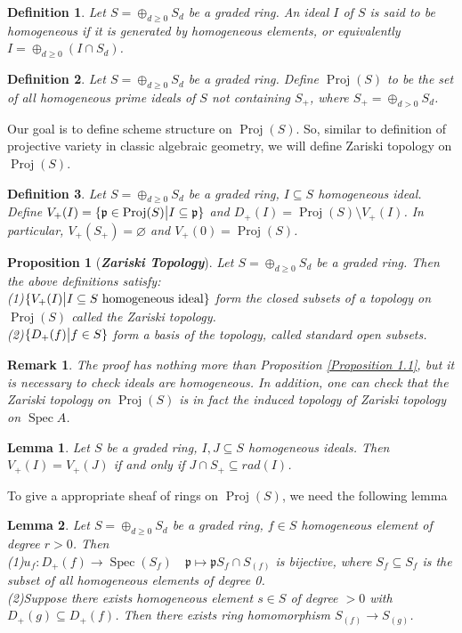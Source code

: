 \documentclass{ctexart}
\newtheorem{definition}{Definition}[section]
\newtheorem{remark}{Remark}[section]
\newtheorem{proposition}{Proposition}[section]
\newtheorem{lemma}{Lemma}[section]
\newcommand{\spec}{\operatorname{Spec}}
\newcommand{\proj}{\operatorname{Proj}}
\begin{document}
\begin{definition}
    Let $S = \oplus_{d \ge 0} S_{d}$ be a graded ring.
    An ideal $I$ of $S$ is said to be homogeneous if it is generated by homogeneous elements,
    or equivalently $I = \oplus_{d \ge 0} (I \cap S_{d})$.
\end{definition}
\begin{definition}
    Let $S = \oplus_{d \ge 0} S_{d}$ be a graded ring.
    Define $\proj(S)$ to be the set of all homogeneous prime ideals of $S$ not containing $S_{+}$,
    where $S_{+} = \oplus_{d > 0} S_{d}$.
\end{definition}
Our goal is to define scheme structure on $\proj(S)$.
So, similar to definition of projective variety in classic algebraic geometry, we will define Zariski topology on $\proj(S)$.
\begin{definition}
    Let $S = \oplus_{d \ge 0} S_{d}$ be a graded ring, $I \subseteq S$ homogeneous ideal.
    Define $V_{+}(I) = \{\mathfrak{p}\in \proj(S) \big{|} I \subseteq \mathfrak{p}\}$ and $D_{+}(I) = \proj(S) \setminus V_{+}(I)$.
    In particular, $V_{+}(S_{+}) = \varnothing$ and $V_{+}(0) = \proj(S)$.
\end{definition}
\begin{proposition}[\textbf{\emph{Zariski Topology}}]
    Let $S = \oplus_{d \ge 0} S_{d}$ be a graded ring.
    Then the above definitions satisfy: \\
    (1)$\{V_{+}(I) \big{|} I \subseteq S \text{ homogeneous ideal}\}$ form the closed subsets of a topology on $\proj(S)$ called the Zariski topology. \\
    (2)$\{D_{+}(f) \big{|} f\in S\}$ form a basis of the topology, called standard open subsets.
    \label{Proposition 1.13}
\end{proposition}
\begin{remark}
    The proof has nothing more than Proposition \ref{Proposition 1.1}, but it is necessary to check ideals are homogeneous.
    In addition, one can check that the Zariski topology on $\proj(S)$ is in fact the induced topology of Zariski topology on $\spec A$.
\end{remark}
\begin{lemma}
    Let $S$ be a graded ring, $I,J \subseteq S$ homogeneous ideals.
    Then $V_{+}(I) = V_{+}(J)$ if and only if $J \cap S_{+} \subseteq rad(I)$.
    \label{Lemma 1.2}
\end{lemma}
To give a appropriate sheaf of rings on $\proj(S)$, we need the following lemma
\begin{lemma}
    Let $S = \oplus_{d \ge 0} S_{d}$ be a graded ring, $f\in S$ homogeneous element of degree $r > 0$.
    Then \\
    (1)$u_{f}: D_{+}(f) \longrightarrow \spec(S_{f})\quad \mathfrak{p} \longmapsto \mathfrak{p}S_{f} \cap S_{(f)}$ is bijective,
    where $S_{f} \subseteq S_{f}$ is the subset of all homogeneous elements of degree 0. \\
    (2)Suppose there exists homogeneous element $s\in S$ of degree $> 0$ with $D_{+}(g) \subseteq D_{+}(f)$.
    Then there exists ring homomorphism $S_{(f)} \longrightarrow S_{(g)}$.
    \label{Lemma 1.3}
\end{lemma}
\end{document}
